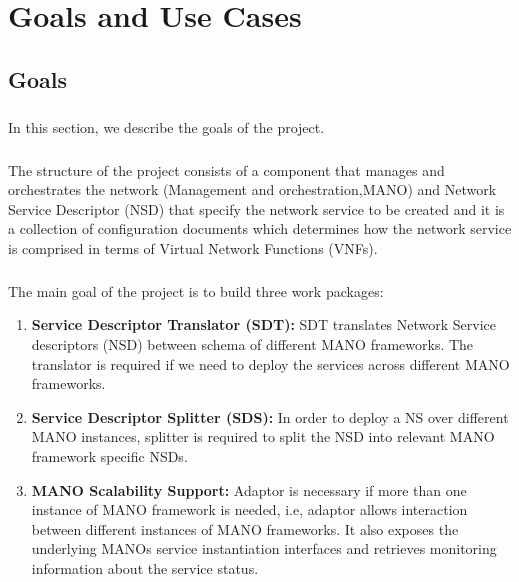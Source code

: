 \chapter{Goals and Use Cases}
\label{ch:Goals and Use Cases}


\section{Goals}
\paragraph{}
In this section, we describe the goals of the project.


\paragraph{}
The structure of the project consists of a component that manages and orchestrates the network (Management and orchestration,MANO) and Network Service Descriptor (NSD) that specify the network service to be created and it is a collection of configuration documents which determines how the network service is comprised in terms of Virtual Network Functions (VNFs).


\paragraph{}
The main goal of the project is to build three work packages:

\begin{enumerate}
	\item \textbf{Service Descriptor Translator (SDT):} SDT translates Network Service descriptors (NSD) between schema of different MANO frameworks. The translator is required if we need to deploy the services across different MANO frameworks.
	
	\item \textbf{Service Descriptor Splitter (SDS):} In order to deploy a NS over different MANO instances, splitter is required to split the NSD into relevant MANO framework specific NSDs.
	
	\item \textbf{MANO Scalability Support:} Adaptor is necessary if more than one instance of MANO framework is needed, i.e,  adaptor allows interaction between different instances of MANO frameworks. It also exposes the underlying MANOs service instantiation interfaces and retrieves monitoring information about the service status.
\end{enumerate}

